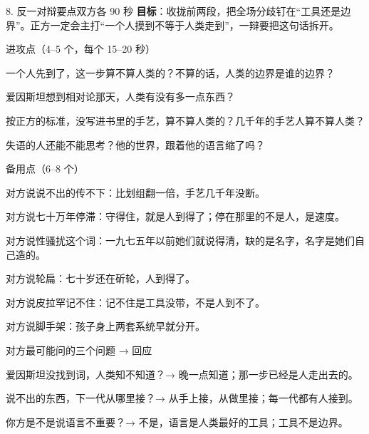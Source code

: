 \documentclass[script,con]{debate}
\begin{document}
\begin{stage}{8. 反一对辩要点}{双方各 90 秒}
\textbf{目标}：收拢前两段，把全场分歧钉在“工具还是边界”。正方一定会主打“一个人摸到不等于人类走到”，一辩要把这句话拆开。
\begin{points}{进攻点（4–5 个，每个 15–20 秒）}
\item 一个人先到了，这一步算不算人类的？不算的话，人类的边界是谁的边界？
\item 爱因斯坦想到相对论那天，人类有没有多一点东西？
\item 按正方的标准，没写进书里的手艺，算不算人类的？几千年的手艺人算不算人类？
\item 失语的人还能不能思考？他的世界，跟着他的语言缩了吗？
\end{points}
\begin{points}{备用点（6–8 个）}
\item 对方说说不出的传不下：比划组翻一倍，手艺几千年没断。
\item 对方说七十万年停滞：守得住，就是人到得了；停在那里的不是人，是速度。
\item 对方说性骚扰这个词：一九七五年以前她们就说得清，缺的是名字，名字是她们自己造的。
\item 对方说轮扁：七十岁还在斫轮，人到得了。
\item 对方说皮拉罕记不住：记不住是工具没带，不是人到不了。
\item 对方说脚手架：孩子身上两套系统早就分开。
\end{points}
\begin{points}{对方最可能问的三个问题 → 回应}
\item 爱因斯坦没找到词，人类知不知道？→ 晚一点知道；那一步已经是人走出去的。
\item 说不出的东西，下一代从哪里接？→ 从手上接，从做里接；每一代都有人接到。
\item 你方是不是说语言不重要？→ 不是，语言是人类最好的工具；工具不是边界。
\end{points}
\end{stage}
\end{document}
